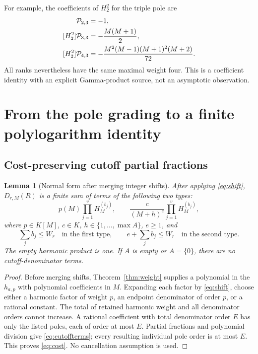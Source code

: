 \documentclass[11pt,letterpaper]{article}
\numberwithin{equation}{section}
\newtheorem{lemma}[theorem]{Lemma}
\theoremstyle{definition}\newtheorem{definition}[theorem]{Definition}
\theoremstyle{remark}\newtheorem{remark}[theorem]{Remark}
\begin{document}
For example, the coefficients of $H_2^2$ for the triple pole are
\begin{align}
 [H_2^2]\mathcal P_{2,3}&=-1,\notag\\
 [H_2^2]\mathcal P_{3,3}&=-\frac{M(M+1)}2,\notag\\
 [H_2^2]\mathcal P_{4,3}&=
 -\frac{M^2(M-1)(M+1)^2(M+2)}{72}.
 \label{eq:sharpexamples}
\end{align}
All ranks nevertheless have the same maximal weight four. This is a
coefficient identity with an explicit Gamma-product source, not an
asymptotic observation.

\section{From the pole grading to a finite polylogarithm identity}
\label{sec:compiler}

\subsection{Cost-preserving cutoff partial fractions}

\begin{lemma}[Normal form after merging integer shifts]\label{thm:cutoffnormal}
After applying \eqref{eq:shift}, $D_{r,M}(R)$ is a finite sum of terms
of the following two types:
\begin{equation}\label{eq:cutoffterms}
       p(M)\prod_{j=1}^v H_M^{(b_j)},\qquad
       \frac{c}{(M+h)^e}\prod_{j=1}^v H_M^{(b_j)},
\end{equation}
where $p\in K[M]$, $c\in K$, $h\in\{1,\ldots,\max A\}$,
$e\ge1$, and
\begin{equation}\label{eq:cost}
 \sum_j b_j\le W_r\quad\text{in the first type},\qquad
 e+\sum_jb_j\le W_r\quad\text{in the second type}.
\end{equation}
The empty harmonic product is one. If $A$ is empty or $A=\{0\}$,
there are no cutoff-denominator terms.
\end{lemma}
\begin{proof}
Before merging shifts, Theorem~\ref{thm:weight} supplies a polynomial
in the $h_{a,p}$ with polynomial coefficients in $M$. Expanding each
factor by \eqref{eq:shift}, choose either a harmonic factor of weight
$p$, an endpoint denominator of order $p$, or a rational constant.
The total of retained harmonic weight and all denominator orders cannot
increase. A rational coefficient with total denominator order $E$ has
only the listed poles, each of order at most $E$. Partial fractions
and polynomial division give \eqref{eq:cutoffterms}; every resulting
individual pole order is at most $E$. This proves \eqref{eq:cost}.
No cancellation assumption is used.
\end{proof}
\end{document}
